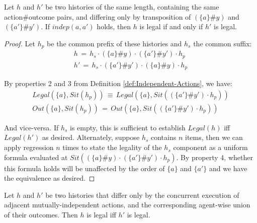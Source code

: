 \begin{thm}
Let $h$ and $h'$ be two histories of the same length, containing
the same action\#outcome pairs, and differing only by transposition
of $(\{a\}\#y)$ and $(\{a'\}\#y')$. If $indep(a,a')$ holds, then
$h$ is legal if and only if $h'$ is legal.\label{thm:Indep-Trans-Equiv}
\end{thm}
\begin{proof}
Let $h_{p}$ be the common prefix of these histories and $h_{s}$
the common suffix:\begin{gather*}
h\,=\, h_{s}\cdot(\{a\}\#y)\cdot(\{a'\}\#y')\cdot h_{p}\\
h'\,=\, h_{s}\cdot(\{a'\}\#y')\cdot(\{a\}\#y)\cdot h_{p}\end{gather*}


By properties 2 and 3 from Definition \ref{def:Independent-Actions},
we have:\begin{gather*}
Legal(\{a\},Sit(h_{p}))\,\equiv\, Legal(\{a\},Sit((\{a'\}\#y')\cdot h_{p}))\\
Out(\{a\},Sit(h_{p}))\,=\, Out(\{a\},Sit((\{a'\}\#y')\cdot h_{p}))\end{gather*}


And vice-versa. If $h_{s}$ is empty, this is sufficient to establish
$Legal(h)$ iff $Legal(h')$ as desired. Alternately, suppose $h_{s}$
contains $n$ items, then we can apply regression $n$ times to state
the legality of the $h_{s}$ component as a uniform formula evaluated
at $Sit((\{a\}\#y)\cdot(\{a'\}\#y')\cdot h_{p})$. By property 4,
whether this formula holds will be unaffected by the order of $\{a\}$
and $\{a'\}$ and we have the equivalence as desired.
\end{proof}
\begin{thm}
Let $h$ and $h'$ be two histories that differ only by the concurrent
execution of adjacent mutually-independent actions, and the corresponding
agent-wise union of their outcomes. Then $h$ is legal iff $h'$ is
legal.\label{thm:Indep-Conc-Equiv}
\end{thm}
